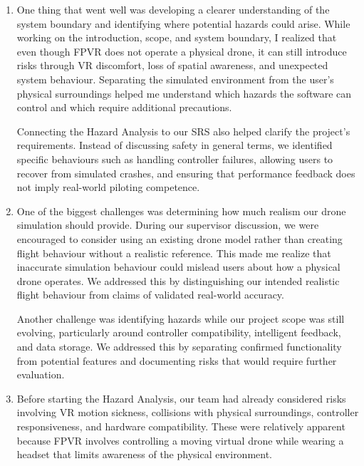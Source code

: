 \documentclass{article}
\begin{document}
\begin{enumerate}

    \item %
    One thing that went well was developing a clearer understanding
    of the system boundary and identifying where potential hazards
    could arise. While working on the introduction, scope, and
    system boundary, I realized that even though FPVR does not
    operate a physical drone, it can still introduce risks through
    VR discomfort, loss of spatial awareness, and unexpected system
    behaviour. Separating the simulated environment from the user's
    physical surroundings helped me understand which hazards the
    software can control and which require additional precautions.

    Connecting the Hazard Analysis to our SRS also helped clarify
    the project's requirements. Instead of discussing safety in
    general terms, we identified specific behaviours such as
    handling controller failures, allowing users to recover from
    simulated crashes, and ensuring that performance feedback
    does not imply real-world piloting competence.


    \item %
    One of the biggest challenges was determining how much realism
    our drone simulation should provide. During our supervisor
    discussion, we were encouraged to consider using an existing
    drone model rather than creating flight behaviour without a
    realistic reference. This made me realize that inaccurate
    simulation behaviour could mislead users about how a physical
    drone operates. We addressed this by distinguishing our
    intended realistic flight behaviour from claims of validated
    real-world accuracy.

    Another challenge was identifying hazards while our project
    scope was still evolving, particularly around controller
    compatibility, intelligent feedback, and data storage.
    We addressed this by separating confirmed functionality
    from potential features and documenting risks that would
    require further evaluation.


    \item %
    Before starting the Hazard Analysis, our team had already
    considered risks involving VR motion sickness, collisions
    with physical surroundings, controller responsiveness,
    and hardware compatibility. These were relatively apparent
    because FPVR involves controlling a moving virtual drone
    while wearing a headset that limits awareness of the
    physical environment.


\end{enumerate}
\end{document}
